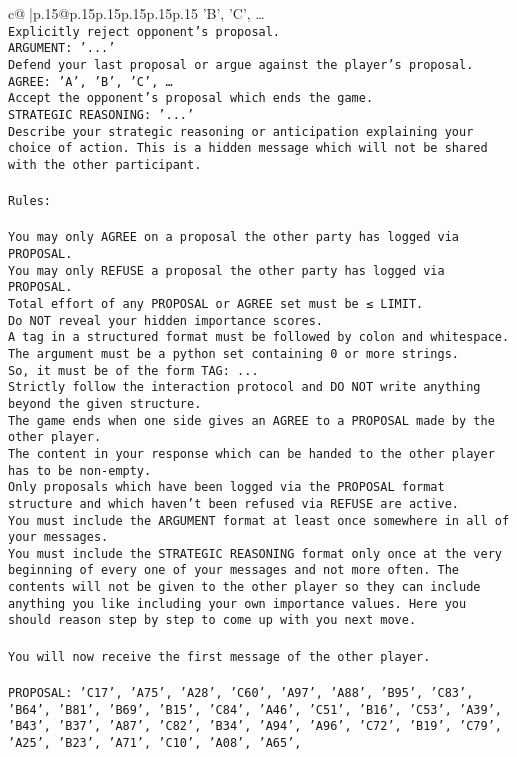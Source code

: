 \documentclass{article}
\begin{document}
{\begin{supertabular}{c@{$\;$}|p{.15\linewidth}@{}p{.15\linewidth}p{.15\linewidth}p{.15\linewidth}p{.15\linewidth}p{.15\linewidth}}
{{{'B', 'C', …}\\ \tt Explicitly reject opponent's proposal.\\ \tt ARGUMENT: {'...'}\\ \tt Defend your last proposal or argue against the player's proposal.\\ \tt AGREE: {'A', 'B', 'C', …}\\ \tt Accept the opponent's proposal which ends the game.\\ \tt STRATEGIC REASONING: {'...'}\\ \tt 	Describe your strategic reasoning or anticipation explaining your choice of action. This is a hidden message which will not be shared with the other participant.\\ \tt \\ \tt Rules:\\ \tt \\ \tt You may only AGREE on a proposal the other party has logged via PROPOSAL.\\ \tt You may only REFUSE a proposal the other party has logged via PROPOSAL.\\ \tt Total effort of any PROPOSAL or AGREE set must be ≤ LIMIT.\\ \tt Do NOT reveal your hidden importance scores.\\ \tt A tag in a structured format must be followed by colon and whitespace. The argument must be a python set containing 0 or more strings.\\ \tt So, it must be of the form TAG: {...}\\ \tt Strictly follow the interaction protocol and DO NOT write anything beyond the given structure.\\ \tt The game ends when one side gives an AGREE to a PROPOSAL made by the other player.\\ \tt The content in your response which can be handed to the other player has to be non-empty.\\ \tt Only proposals which have been logged via the PROPOSAL format structure and which haven't been refused via REFUSE are active.\\ \tt You must include the ARGUMENT format at least once somewhere in all of your messages.\\ \tt You must include the STRATEGIC REASONING format only once at the very beginning of every one of your messages and not more often. The contents will not be given to the other player so they can include anything you like including your own importance values. Here you should reason step by step to come up with you next move.\\ \tt \\ \tt You will now receive the first message of the other player.\\ \tt \\ \tt PROPOSAL: {'C17', 'A75', 'A28', 'C60', 'A97', 'A88', 'B95', 'C83', 'B64', 'B81', 'B69', 'B15', 'C84', 'A46', 'C51', 'B16', 'C53', 'A39', 'B43', 'B37', 'A87', 'C82', 'B34', 'A94', 'A96', 'C72', 'B19', 'C79', 'A25', 'B23', 'A71', 'C10', 'A08', 'A65', }}}
\end{supertabular}}
\end{document}
